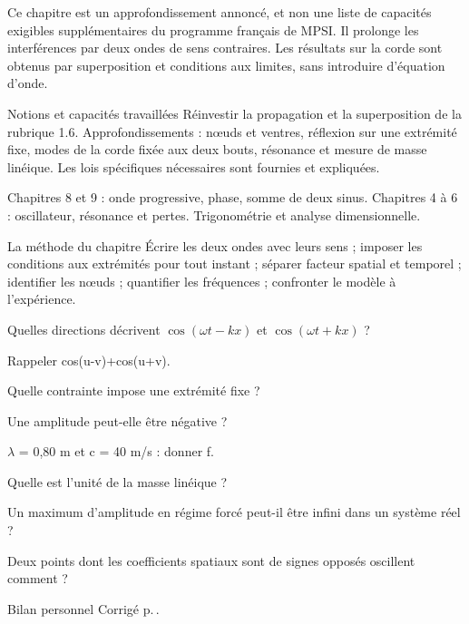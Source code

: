 Ce chapitre est un approfondissement annoncé, et non une liste de capacités exigibles supplémentaires du programme français de MPSI. Il prolonge les interférences par deux ondes de sens contraires. Les résultats sur la corde sont obtenus par superposition et conditions aux limites, sans introduire d’équation d’onde.
\begin{loi}{Notions et capacités travaillées}
Réinvestir la propagation et la superposition de la rubrique 1.6. Approfondissements : nœuds et ventres, réflexion sur une extrémité fixe, modes de la corde fixée aux deux bouts, résonance et mesure de masse linéique. Les lois spécifiques nécessaires sont fournies et expliquées.
\end{loi}

Chapitres 8 et 9 : onde progressive, phase, somme de deux sinus. Chapitres 4 à 6 : oscillateur, résonance et pertes. Trigonométrie et analyse dimensionnelle.

\begin{methode}{La méthode du chapitre}
Écrire les deux ondes avec leurs sens ; imposer les conditions aux extrémités pour tout instant ; séparer facteur spatial et temporel ; identifier les nœuds ; quantifier les fréquences ; confronter le modèle à l’expérience.
\end{methode}


\begin{questions}
\item Quelles directions décrivent $\cos(\omega t-kx)$ et $\cos(\omega t+kx)$ ?
\item Rappeler cos(u-v)+cos(u+v).
\item Quelle contrainte impose une extrémité fixe ?
\item Une amplitude peut-elle être négative ?
\item \ensuremath{\lambda} = 0,80 m et c = 40 m/s : donner f.
\item Quelle est l’unité de la masse linéique ?
\item Un maximum d’amplitude en régime forcé peut-il être infini dans un système réel ?
\item Deux points dont les coefficients spatiaux sont de signes opposés oscillent comment ?
\end{questions}
\begin{docu}{Bilan personnel}
Corrigé p.\,\pageref{ch10-corr-diag}.
\end{docu}


